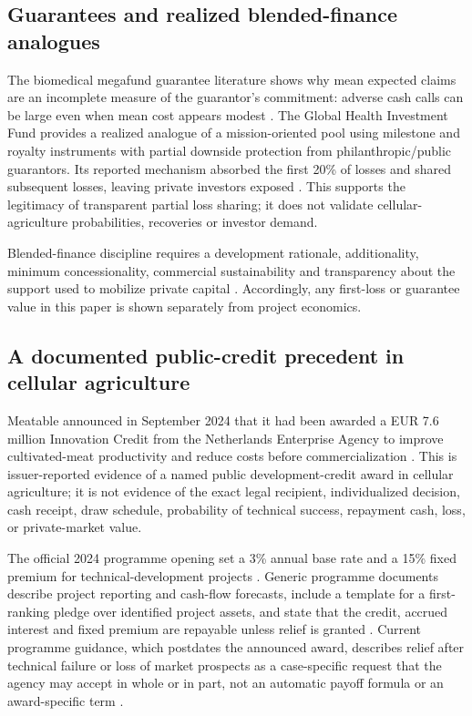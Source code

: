 \documentclass[11pt,a4paper]{article}
\begin{document}
\subsection{Guarantees and realized blended-finance analogues}

The biomedical megafund guarantee literature shows why mean expected claims are an incomplete measure of the guarantor's commitment: adverse cash calls can be large even when mean cost appears modest \citep{fagnan2013cancer}. The Global Health Investment Fund provides a realized analogue of a mission-oriented pool using milestone and royalty instruments with partial downside protection from philanthropic/public guarantors. Its reported mechanism absorbed the first 20\% of losses and shared subsequent losses, leaving private investors exposed \citep{worldbank2017ghif}. This supports the legitimacy of transparent partial loss sharing; it does not validate cellular-agriculture probabilities, recoveries or investor demand.

Blended-finance discipline requires a development rationale, additionality, minimum concessionality, commercial sustainability and transparency about the support used to mobilize private capital \citep{ifcblended}. Accordingly, any first-loss or guarantee value in this paper is shown separately from project economics.

\subsection{A documented public-credit precedent in cellular agriculture}

Meatable announced in September 2024 that it had been awarded a EUR 7.6 million Innovation Credit from the Netherlands Enterprise Agency to improve cultivated-meat productivity and reduce costs before commercialization \citep{meatable2024credit}. This is issuer-reported evidence of a named public development-credit award in cellular agriculture; it is not evidence of the exact legal recipient, individualized decision, cash receipt, draw schedule, probability of technical success, repayment cash, loss, or private-market value.

The official 2024 programme opening set a 3\% annual base rate and a 15\% fixed premium for technical-development projects \citep{nl2024innovationcredit}. Generic programme documents describe project reporting and cash-flow forecasts, include a template for a first-ranking pledge over identified project assets, and state that the credit, accrued interest and fixed premium are repayable unless relief is granted \citep{rvo2024obligations}. Current programme guidance, which postdates the announced award, describes relief after technical failure or loss of market prospects as a case-specific request that the agency may accept in whole or in part, not an automatic payoff formula or an award-specific term \citep{rvo2026following}.
\end{document}
